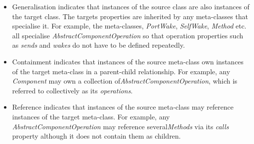 \begin{itemize}
\item Generalisation indicates that instances of the source class are also instances of the target class. The targets properties are inherited by any meta-classes that specialise it.  For example, the meta-classes, \emph{PortWake}, \emph{SelfWake}, \emph{Method} etc. all specialise \emph{AbstractComponentOperation} so that operation properties such as \emph{sends} and \emph{wakes} do not have to be defined repeatedly. 
\item Containment indicates that instances of the source meta-class own instances of the target meta-class in a parent-child relationship. For example, any \emph{Component} may own a collection of\emph{AbstractComponentOperation}, which is referred to collectively as its \emph{operations}. 
\item Reference indicates that instances of the source meta-class may reference instances of the target meta-class. For example, any \emph{AbstractComponentOperation} may reference several\emph{Methods} via its \emph{calls} property although it does not contain them as children. 
\end{itemize}


